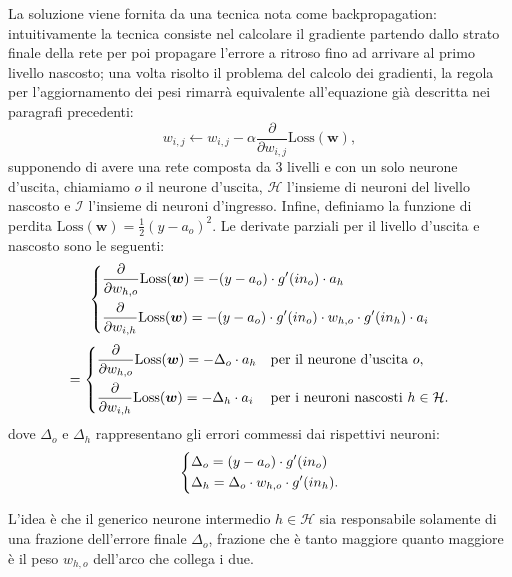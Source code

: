 \documentclass[../../main.tex]{subfiles}
\begin{document}
La soluzione viene fornita da una tecnica nota come backpropagation: intuitivamente la tecnica consiste nel calcolare il gradiente partendo dallo strato finale della rete per poi propagare l'errore a ritroso fino ad arrivare al primo livello nascosto; una volta risolto il problema del calcolo dei gradienti, la regola per l'aggiornamento dei pesi rimarrà equivalente all'equazione già descritta nei paragrafi precedenti:
\begin{equation}
    w_{i,j} \leftarrow w_{i,j} - \alpha \frac{\partial}{\partial w_{i,j}}\mathrm{Loss}(\boldsymbol{w}),
    \label{eqn:mlpgradientdesc}
\end{equation}
supponendo di avere una rete composta da 3 livelli e con un solo neurone d'uscita, chiamiamo $o$ il neurone d'uscita, $\mathcal{H}$ l'insieme di neuroni del livello nascosto e $\mathcal{I}$ l'insieme di neuroni d'ingresso. Infine, definiamo la funzione di perdita $\mathrm{Loss}(\boldsymbol{w}) = \frac{1}{2} (y - a_o)^2$. Le derivate parziali per il livello d'uscita e nascosto sono le seguenti:
\begin{equation*}
    \begin{dcases}
        \frac{\partial}{\partial w_{h,o}} \mathrm{Loss}(\boldsymbol{w}) = - (y - a_{o}) \cdot g'(in_o) \cdot a_h\\
        \frac{\partial}{\partial w_{i,h}} \mathrm{Loss}(\boldsymbol{w}) =  - (y - a_{o}) \cdot g'(in_o) \cdot w_{h,o} \cdot g'(in_h) \cdot a_i
    \end{dcases}
\end{equation*}
\begin{equation}
    =
    \begin{dcases}
        \frac{\partial}{\partial w_{h,o}} \mathrm{Loss}(\boldsymbol{w}) = - \Delta_o \cdot a_h & \text{per il neurone d'uscita } o,\\
        \frac{\partial}{\partial w_{i,h}} \mathrm{Loss}(\boldsymbol{w}) = - \Delta_h \cdot a_i& \text{per i neuroni nascosti } h \in \mathcal{H}.
    \end{dcases}   
    \label{eqn:backpropgradient}
\end{equation}
dove $\Delta_o$ e $\Delta_h$ rappresentano gli errori commessi dai rispettivi neuroni:
\[
\begin{dcases}
    \Delta_o = (y - a_{o}) \cdot g'(in_o)\\
    \Delta_h = \Delta_o \cdot w_{h,o} \cdot g'(in_h) .
\end{dcases}    
\]

L'idea è che il generico neurone intermedio $h \in \mathcal{H}$ sia responsabile solamente di una frazione dell'errore finale $\Delta_o$, frazione che è tanto maggiore quanto maggiore è il peso $w_{h,o}$ dell'arco che collega i due.
\end{document}
